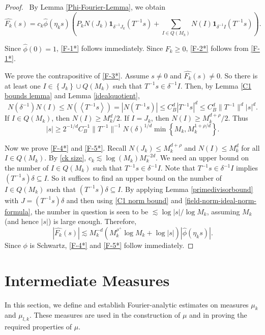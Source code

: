 \documentclass{amsart}
\numberwithin{equation}{section}
\theoremstyle{definition}
\theoremstyle{definition}
\newcommand{\cbr}[1]{ \left\{ {#1} \right\} }
\newcommand{\abr}[1]{\left\langle {#1} \right\rangle}
\def\one{\mathbf{1}}
\begin{document}
\begin{proof} 
\
By Lemma \ref{Phi-Fourier-Lemma}, we obtain 
$$
\widehat{F_k}(s) 
= c_k \widehat{\phi}(\eta_k s) \left( P_k N(J_k) \mathbf{1}_{\delta^{-1}J_k} (T^{-1} s)+ \sum_{I \in Q(M_k)} N(I) \one_{\delta^{-1} I}(T^{-1}s) \right).
$$

Since $\widehat{\phi}(0) = 1$, \eqref{F-1*} follows immediately. Since $F_k \geq 0$, \eqref{F-2*} follows from \eqref{F-1*}.

We prove the contrapositive of \eqref{F-3*}. 
Assume $s \neq 0$ and $\widehat{F_k}(s) \neq 0$. 
So there is at least one $I \in \cbr{J_{k}} \cup Q(M_k)$ such that $T^{-1} s \in \delta^{-1} I$. 
Then, by Lemma \ref{C1 bounds lemma} and Lemma \ref{idealquotient},
$$
N(\delta^{-1})N(I) \leq N(\abr{T^{-1} s}) = |N(T^{-1} s)| \leq C_B^d |T^{-1} s|^d \leq C_B^d \|T^{-1}\|^d |s|^d. 
$$
If $I \in Q(M_k)$, then $N(I) \geq M_k^d/2$. If $I = J_k$, then $N(I) \geq M_k^{d+\rho}/2$. 
Thus $$|s| \geq 2^{-1/d}C_B^{-1} \|T^{-1}\|^{-1} N(\delta)^{1/d} \min\cbr{M_k,M_k^{1+\rho/d}}.$$  

Now we prove \eqref{F-4*} and \eqref{F-5*}. 
Recall $N(J_k) \leq M_k^{d+\rho}$ and $N(I) \leq M_k^d$ for all $I \in Q(M_k)$. 
By \eqref{ck size}, $c_k \lesssim \log(M_k) M_k^{-2d}$. 
We need an upper bound on the number of $I \in Q(M_k)$ such that $T^{-1}s \in \delta^{-1} I$. 
Note that $T^{-1}s \in \delta^{-1} I$ implies $ (T^{-1}s) \delta \subseteq I$. So it suffices to find an upper bound on the number of $I \in Q(M_k)$ such that $ (T^{-1}s) \delta \subseteq  I$. By applying Lemma \ref{primedivisorbound} with $J = (T^{-1}s) \delta$ and then using \eqref{C1 norm bound} and \eqref{field-norm-ideal-norm-formula}, the number in question is seen to be $\lesssim \log |s|/\log M_k$, assuming $M_k$ (and hence $|s|$) is large enough.  
Therefore,
\[
|\widehat{F_k}(s)| 
\lesssim M_k^{-d} 
( 
M_k^{\rho^+}
\log M_k
+
\log |s|) |\widehat{\phi} (\eta_k s)|.
\]
Since $\phi$ is Schwartz, \eqref{F-4*} and \eqref{F-5*} follow immediately. 
\end{proof}

\section{Intermediate Measures}
\label{Intermediate Measures}




In this section, we define and establish Fourier-analytic estimates on measures $\mu_k$ and $\mu_{l,k}$.
These measures are used in the construction of $\mu$ and in proving the required properties of $\mu$.
\end{document}
